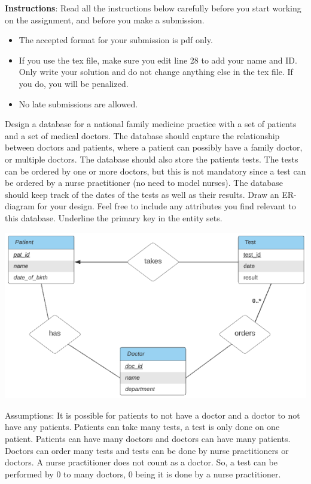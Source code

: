 \documentclass[a4 paper]{article}
\begin{document}
\textbf{Instructions}: Read all the instructions below carefully before you start working on the assignment, and before you make a submission.
\begin{itemize}
    \item The accepted format for your submission is pdf only.
    \item If you use the tex file, make sure you edit line 28 to add your name and ID. Only write your solution and do not change anything else in the tex file. If you do, you will be penalized.
    \item No late submissions are allowed.
\end{itemize}



Design a database for a national family medicine practice with a set of patients and a set of medical doctors. The database should capture the relationship between doctors and patients, where a patient can possibly have a family doctor, or multiple doctors. The database should also store the patients tests. The tests can be ordered by one or more doctors, but this is not mandatory since a test can be ordered by a nurse practitioner (no need to model nurses). The database should keep track of the dates of the tests as well as their results. Draw an ER-diagram for your design. Feel free to include any attributes you find relevant to this database. Underline the primary key in the entity sets.

\includegraphics[width=\textwidth]{er1.png}

Assumptions: 
It is possible for patients to not have a doctor and a doctor to not have any patients. Patients can take many tests, a test is only done on one patient. Patients can have many doctors and doctors can have many patients.
Doctors can order many tests and tests can be done by nurse practitioners or doctors. A nurse practitioner does not count as a doctor.
So, a test can be performed by 0 to many doctors, 0 being it is done by a nurse practitioner.
\end{document}
